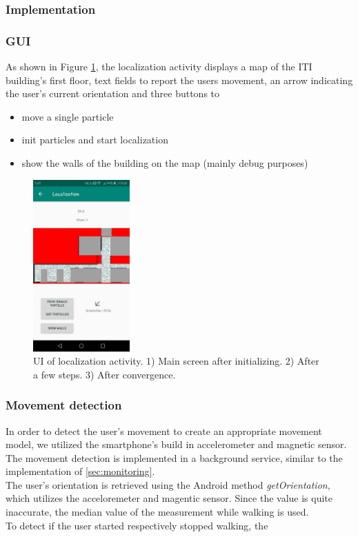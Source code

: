 \documentclass[12pt]{article}
\begin{document}
\subsubsection{Implementation}
\subsubsection*{GUI}
As shown in Figure \ref{fig:localization}, the localization activity displays a map of the ITI building's first floor, text fields to report the users movement, an arrow indicating the user's current orientation and three buttons to 
\begin{itemize}[noitemsep,topsep=0pt]
	\item move a single particle
	\item init particles and start localization
	\item show the walls of the building on the map (mainly debug purposes)
\end{itemize}

\begin{figure}
	\centering
	\includegraphics[width=140px]{images/localization.jpeg}
	\caption{UI of localization activity. 1) Main screen after initializing. 2) After a few steps. 3) After convergence. }
	\label{fig:localization}
\end{figure}

\subsubsection*{Movement detection}\label{sec:movement}
In order to detect the user's movement to create an appropriate movement model, we utilized the smartphone's build in accelerometer and magnetic sensor. The movement detection is implemented in a background service, similar to the implementation of \ref{sec:monitoring}.\\
The user's orientation is retrieved using the Android method \textit{getOrientation}, which utilizes the acceloremeter and magentic sensor. Since the value is quite inaccurate, the median value of the measurement while walking is used.\\
To detect if the user started respectively stopped walking, the %
\end{document}
